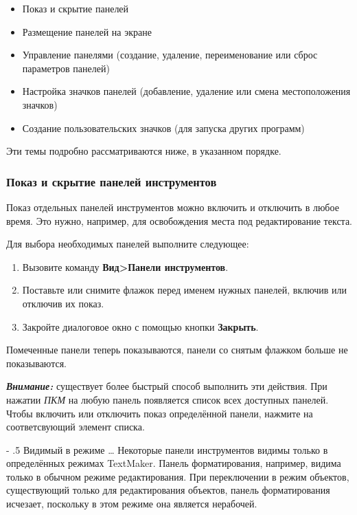 ﻿\documentclass[a4paper,10pt]{article}
\makeatletter
\renewcommand\paragraph{%
   \@startsection{paragraph}{4}{0mm}%
      {-\baselineskip}%
      {.5\baselineskip}%
      {\normalfont\normalsize\bfseries}}
\makeatother
\begin{document}
\begin{itemize}
 \item Показ и скрытие панелей
 \item Размещение панелей на экране
 \item Управление панелями (создание, удаление, переименование или сброс параметров панелей)
 \item Настройка значков панелей (добавление, удаление или смена местоположения значков)
 \item Создание пользовательских значков (для запуска других программ)
\end{itemize}

 Эти темы подробно рассматриваются ниже, в указанном порядке.
 
 \subsubsection{Показ и скрытие панелей инструментов}
 Показ отдельных панелей инструментов можно включить и отключить в любое время. Это нужно, например, для освобождения места под редактирование текста.
 
 Для выбора необходимых панелей выполните следующее:
 
 \begin{enumerate}
  \item Вызовите команду \textbf{Вид>Панели инструментов}.
  \item Поставьте или снимите флажок перед именем нужных панелей, включив или отключив их показ.
  \item Закройте диалоговое окно с помощью кнопки \textbf{Закрыть}.
 \end{enumerate}

  Помеченные панели теперь показываются, панели со снятым флажком больше не показываются.
  
  \begin{mdframed}[backgroundcolor=blue!10]
  \textbf{\textit{Внимание:}} существует более быстрый способ выполнить эти действия. При нажатии \textit{ПКМ} на любую панель появляется список всех доступных панелей. Чтобы включить или отключить показ определённой панели, нажмите на соответсвующий элемент списка.
  \end{mdframed}
  
\paragraph{Видимый в режиме …}
Некоторые панели инструментов видимы только в определённых режимах TextMaker. Панель форматирования, например, видима только в обычном режиме редактирования. При переключении в режим объектов, существующий только для редактирования объектов, панель форматирования исчезает, поскольку в этом режиме она является нерабочей.
\end{document}
